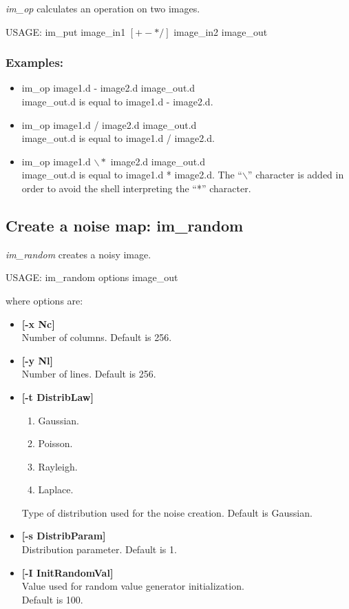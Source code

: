 {\em im\_op} calculates an operation on two images.
{\bf
\begin{center}
USAGE: im\_put image\_in1 $[+-*/]$ image\_in2 image\_out
\end{center}}
\subsubsection*{Examples:}
\begin{itemize}
\item im\_op  image1.d - image2.d  image\_out.d\\
image\_out.d is equal to image1.d - image2.d.
\item im\_op  image1.d / image2.d  image\_out.d\\
image\_out.d is equal to image1.d / image2.d.
\item im\_op  image1.d $\backslash *$  image2.d  image\_out.d\\
image\_out.d is equal to image1.d * image2.d. The ``$\backslash$'' 
character is
added in order to avoid the shell interpreting the ``*'' character.

\end{itemize}

\subsection{Create a noise map: im\_random}
{\em im\_random} creates a noisy image.
{\bf
\begin{center}
USAGE: im\_random options image\_out
\end{center}}
where options are:
\begin{itemize}
\item {\bf[-x Nc]} \\
 Number of columns. Default is 256.
\item {\bf[-y Nl]} \\
Number of lines. Default is 256.
\item {\bf [-t DistribLaw]}  
\begin{enumerate}
\baselineskip=0.4truecm
\item Gaussian.
\item Poisson.
\item Rayleigh.
\item Laplace.
\end{enumerate}
Type of distribution used for the noise creation. Default is Gaussian.
\item {\bf [-s DistribParam]} \\
Distribution parameter. Default is 1.
\item {\bf [-I InitRandomVal]} \\
Value used for random value generator initialization. \\
Default is 100. 
\end{itemize}
